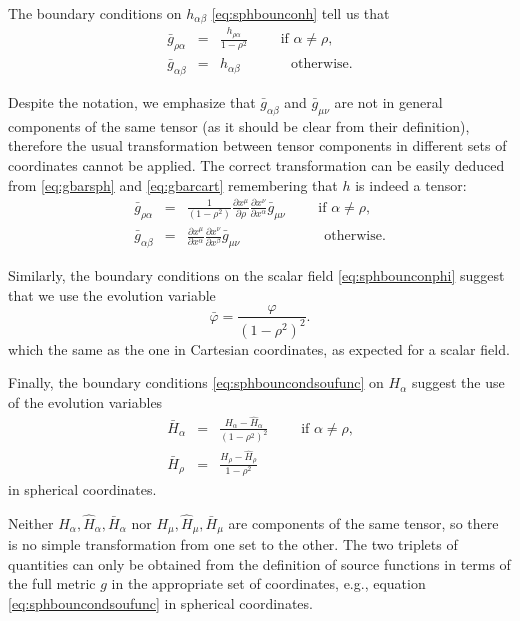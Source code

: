 \documentclass[a4paper,11pt]{article}
\numberwithin{equation}{section}
\begin{document}
The boundary conditions on $h_{\alpha\beta}$ \eqref{eq:sphbounconh} tell us that
\begin{eqnarray}\label{eq:gbarsph}
\bar{g}_{\rho\alpha}&=&\frac{h_{\rho\alpha} }{1-\rho^2}\qquad \textrm{ if $\alpha\neq\rho$}, \\ \nonumber
\bar{g}_{\alpha\beta}&=&h_{\alpha\beta} \qquad\;\;\;\;\, \textrm{ otherwise}.
\end{eqnarray}

Despite the notation, we emphasize that $\bar{g}_{\alpha\beta}$ and $\bar{g}_{\mu\nu}$ are not in general components of the same tensor (as it should be clear from their definition), therefore the usual transformation between tensor components in different sets of coordinates cannot be applied. The correct transformation can be easily deduced from \eqref{eq:gbarsph} and \eqref{eq:gbarcart} remembering that $h$ is indeed a tensor: 
\begin{eqnarray}\label{eq:cartosph}
\bar{g}_{\rho\alpha}&=&\frac{1}{(1-\rho^2)}\frac{\partial x^\mu}{\partial \rho}\frac{\partial x^\nu}{\partial x^\alpha}\bar{g}_{\mu\nu}\qquad \textrm{ if $\alpha\neq\rho$}, \\ \nonumber
\bar{g}_{\alpha\beta}&=&\frac{\partial x^\mu}{\partial x^\alpha}\frac{\partial x^\nu}{\partial x^\beta}\bar{g}_{\mu\nu}\qquad\qquad \;\;\;\;\;\; \textrm{ otherwise}.
\end{eqnarray}

Similarly, the boundary conditions on the scalar field \eqref{eq:sphbounconphi} suggest that we use the evolution variable
\begin{equation}
\bar{\varphi}=\frac{\varphi }{(1-\rho^2)^2}.
\end{equation}
which the same as the one in Cartesian coordinates, as expected for a scalar field.

Finally, the boundary conditions \eqref{eq:sphbouncondsoufunc} on $H_\alpha$ suggest the use of the evolution variables
\begin{eqnarray}
 \bar{H}_\alpha&=&\frac{H_\alpha-\hat{H}_\alpha}{(1-\rho^2)^2 } \qquad \textrm{ if $\alpha\neq\rho$,} \\ \nonumber
 \bar{H}_\rho&=&\frac{H_\rho-\hat{H}_\rho}{1-\rho^2 }
 \end{eqnarray}
in spherical coordinates.

Neither $H_\alpha,\hat{H}_\alpha,\bar{H}_\alpha$ nor $H_\mu,\hat{H}_\mu,\bar{H}_\mu$ are components of the same tensor, so there is no simple transformation from one set to the other. The two triplets of quantities can only be obtained from the definition of source functions in terms of the full metric $g$ in the appropriate set of coordinates, e.g., equation \eqref{eq:sphbouncondsoufunc} in spherical coordinates.
\end{document}
